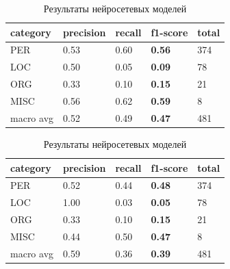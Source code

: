 \hfill
\begin{table}[h!]
\label{table:res}
\begin{subtable}[h]{0.4\textwidth}

\begin{tabular}{| l | l | l | l | l |}
\hline

 category &precision  &  recall & \textbf{f1-score} &  total\\
\hline
PER &  0.53 & 0.60 & \textbf{0.56} &  374 \\ 
\hline
LOC &  0.50 & 0.05 & \textbf{0.09} &   78 \\ 
\hline
ORG &  0.33 & 0.10 & \textbf{0.15} &   21 \\
\hline
MISC &  0.56 & 0.62 & \textbf{0.59} &   8 \\
\hline
\hline

 macro avg &  0.52 & 0.49 & \textbf{0.47} &  481 \\
\hline
\end{tabular}

\caption{Результаты модели BERT}
\end{subtable}

\hfill

\begin{subtable}[h]{0.4\textwidth}

\begin{tabular}{| l | l | l | l | l |}
\hline

 category &precision  &  recall & \textbf{f1-score} &  total\\
\hline
PER &  0.52 & 0.44 & \textbf{0.48} &  374 \\ 
\hline
LOC &  1.00 & 0.03 & \textbf{0.05} &   78 \\ 
\hline
ORG &  0.33 & 0.10 & \textbf{0.15} &   21 \\
\hline
MISC &  0.44 & 0.50 & \textbf{0.47} &   8 \\
\hline
\hline

 macro avg &  0.59 & 0.36 & \textbf{0.39} &  481 \\
\hline
\end{tabular}

\caption{Результаты модели Bi-LSTM-CRF}
\end{subtable}
\caption{Результаты нейросетевых моделей}

\end{table}



